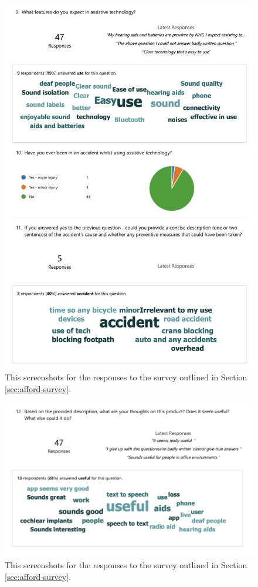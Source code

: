 \documentclass{l4proj}
\begin{document}
\begin{appendices}
\begin{figure}[H]
    \centering
    \includegraphics[width=0.75\linewidth]{dissertation/images/afford-survey-3.jpeg}    
    \caption{This screenshots for the responses to the survey outlined in Section \ref{sec:afford-survey}.}
    \label{fig:afford-survey-3} 
\end{figure}

\begin{figure}[H]
    \centering
    \includegraphics[width=0.75\linewidth]{dissertation/images/afford-survey-4.jpeg}    
    \caption{This screenshots for the responses to the survey outlined in Section \ref{sec:afford-survey}.}
    \label{fig:afford-survey-4} 
\end{figure}


\end{appendices}
\end{document}
